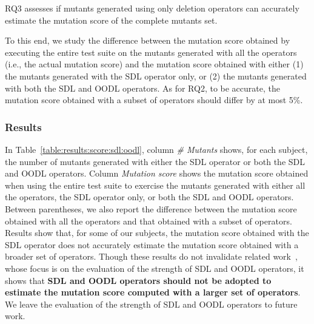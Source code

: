 RQ3 assesses if mutants generated using only deletion operators can accurately estimate the mutation score of the complete mutants set.

To this end, we study the difference between the mutation score obtained by executing the entire test suite on the mutants generated with all the operators (i.e., the actual mutation score) and the mutation score obtained with either (1) the mutants generated with the SDL operator only, or (2) the mutants generated with both the SDL and OODL operators.
As for RQ2, to be accurate, the mutation score obtained with a subset of operators should differ by at most 5\%.


\subsubsection{Results}



In Table~\ref{table:results:score:sdl:oodl}, column \emph{\# Mutants} shows, for each subject, the number of mutants generated with either the SDL operator or both the SDL and OODL operators.
Column \emph{Mutation score} shows the mutation score obtained when using the entire test suite to exercise the mutants generated with either all the operators, the SDL operator only, or both the SDL and OODL operators. Between parentheses, we also report the difference between the mutation score obtained with all the operators and that obtained with a subset of operators. Results show that, for some of our subjects, the mutation score obtained with the SDL operator does not accurately estimate the mutation score obtained with a broader set of operators. Though these results do not invalidate related work~\cite{delamaro2014experimental}, whose focus is on the evaluation of the strength of SDL and OODL operators, it shows that \textbf{SDL and OODL operators should not be adopted to estimate the mutation score computed with a larger set of operators}. We leave the evaluation of the strength of SDL and OODL operators to future work.





%
%

